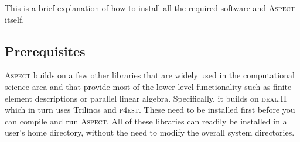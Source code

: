 \documentclass{article}
\newcommand{\dealii}{{\textsc{deal.II}}}
\newcommand{\pfrst}{{\normalfont\textsc{p4est}}}
\newcommand{\aspect}{\textsc{Aspect}}
\begin{document}
This is a brief explanation of how to install all the required software and
\aspect{} itself.

\subsection{Prerequisites}

\aspect{} builds on a few other libraries that are widely used in the
computational science area and that provide most of the lower-level
functionality such as finite element descriptions or parallel linear
algebra. Specifically, it builds on \dealii{} which in turn uses Trilinos and
\pfrst{}. These need to be installed first before you can compile and run
\aspect{}. All of these libraries can readily be installed in a user's home
directory, without the need to modify the overall system directories.
\end{document}
